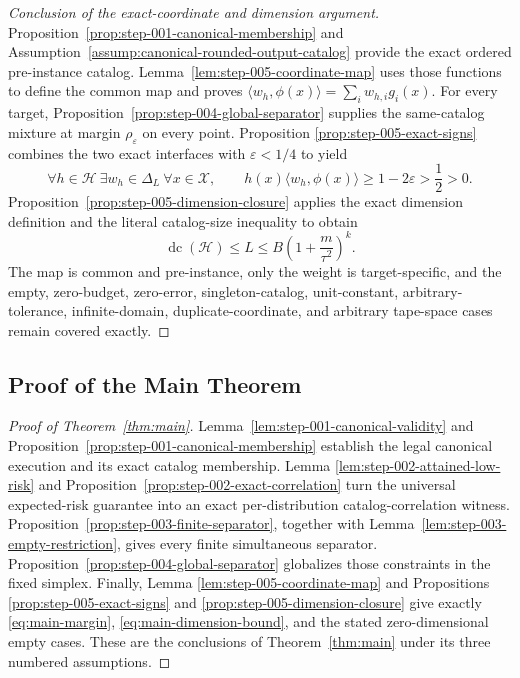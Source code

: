 \begin{proof}[Conclusion of the exact-coordinate and dimension argument]
Proposition~\ref{prop:step-001-canonical-membership} and
Assumption~\ref{assump:canonical-rounded-output-catalog} provide the exact
ordered pre-instance catalog.  Lemma~\ref{lem:step-005-coordinate-map} uses
those functions to define the common map and proves
\(\langle w_h,\phi(x)\rangle=\sum_iw_{h,i}g_i(x)\).  For every target,
Proposition~\ref{prop:step-004-global-separator} supplies the same-catalog
mixture at margin \(\rho_{\varepsilon}\) on every point.  Proposition
\ref{prop:step-005-exact-signs} combines the two exact interfaces with
\(\varepsilon<1/4\) to yield
\[
\forall h\in\mathcal H\ \exists w_h\in\Delta_L\ \forall x\in\mathcal X,
\qquad
h(x)\langle w_h,\phi(x)\rangle
\ge1-2\varepsilon>\frac12>0.
\]
Proposition~\ref{prop:step-005-dimension-closure} applies the exact dimension
definition and the literal catalog-size inequality to obtain
\[
\operatorname{dc}(\mathcal H)
\le L
\le B\left(1+\frac{m}{\tau^2}\right)^k.
\]
The map is common and pre-instance, only the weight is target-specific, and
the empty, zero-budget, zero-error, singleton-catalog, unit-constant,
arbitrary-tolerance, infinite-domain, duplicate-coordinate, and arbitrary
tape-space cases remain covered exactly.
\end{proof}

\subsection{Proof of the Main Theorem}
\label{app:proof-main-theorem}

\begin{proof}[Proof of Theorem~\ref{thm:main}]
Lemma~\ref{lem:step-001-canonical-validity} and
Proposition~\ref{prop:step-001-canonical-membership} establish the legal
canonical execution and its exact catalog membership.  Lemma
\ref{lem:step-002-attained-low-risk} and
Proposition~\ref{prop:step-002-exact-correlation} turn the universal
expected-risk guarantee into an exact per-distribution catalog-correlation
witness.  Proposition~\ref{prop:step-003-finite-separator}, together with
Lemma~\ref{lem:step-003-empty-restriction}, gives every finite simultaneous
separator.  Proposition~\ref{prop:step-004-global-separator} globalizes
those constraints in the fixed simplex.  Finally, Lemma
\ref{lem:step-005-coordinate-map} and Propositions
\ref{prop:step-005-exact-signs} and
\ref{prop:step-005-dimension-closure} give exactly
\eqref{eq:main-margin}, \eqref{eq:main-dimension-bound}, and the stated
zero-dimensional empty cases.  These are the conclusions of
Theorem~\ref{thm:main} under its three numbered assumptions.
\end{proof}

